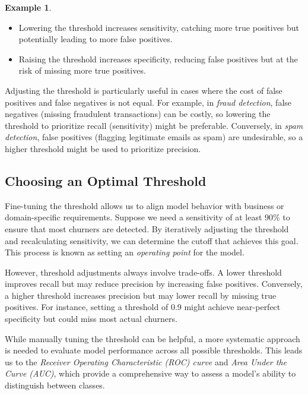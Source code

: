 \documentclass[
]{book}
\providecommand{\tightlist}{%
  \setlength{\itemsep}{0pt}\setlength{\parskip}{0pt}}
\theoremstyle{definition}
\theoremstyle{definition}
\newtheorem{example}{Example}[chapter]
\theoremstyle{definition}
\theoremstyle{definition}
\theoremstyle{remark}
\begin{document}
\begin{example}
\begin{itemize}
\tightlist
\item
  Lowering the threshold increases sensitivity, catching more true positives but potentially leading to more false positives.\\
\item
  Raising the threshold increases specificity, reducing false positives but at the risk of missing more true positives.
\end{itemize}

Adjusting the threshold is particularly useful in cases where the cost of false positives and false negatives is not equal. For example, in \emph{fraud detection}, false negatives (missing fraudulent transactions) can be costly, so lowering the threshold to prioritize recall (sensitivity) might be preferable. Conversely, in \emph{spam detection}, false positives (flagging legitimate emails as spam) are undesirable, so a higher threshold might be used to prioritize precision.
\end{example}

\subsection*{Choosing an Optimal Threshold}\label{choosing-an-optimal-threshold}

Fine-tuning the threshold allows us to align model behavior with business or domain-specific requirements. Suppose we need a sensitivity of at least 90\% to ensure that most churners are detected. By iteratively adjusting the threshold and recalculating sensitivity, we can determine the cutoff that achieves this goal. This process is known as setting an \emph{operating point} for the model.

However, threshold adjustments always involve trade-offs. A lower threshold improves recall but may reduce precision by increasing false positives. Conversely, a higher threshold increases precision but may lower recall by missing true positives. For instance, setting a threshold of 0.9 might achieve near-perfect specificity but could miss most actual churners.

While manually tuning the threshold can be helpful, a more systematic approach is needed to evaluate model performance across all possible thresholds. This leads us to the \emph{Receiver Operating Characteristic (ROC) curve} and \emph{Area Under the Curve (AUC)}, which provide a comprehensive way to assess a model's ability to distinguish between classes.
\end{document}
